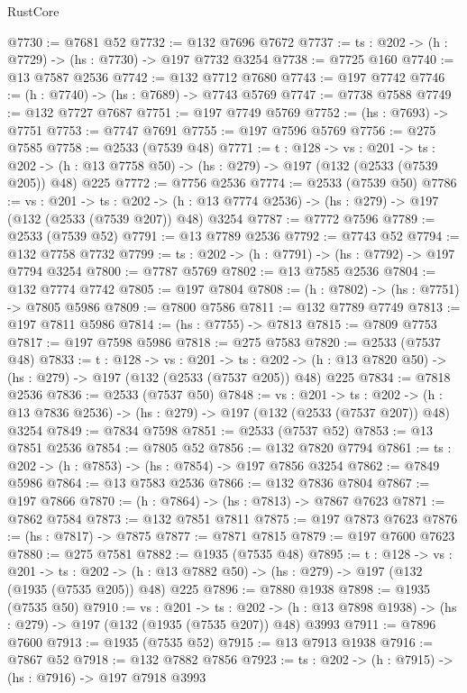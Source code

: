 \begin{lexlean}{RustCore}
\begin{coremodule}
@7730 := @7681 @52
@7732 := @132 @7696 @7672
@7737 := {ts : @202} -> (h : @7729) -> (hs : @7730) -> @197 @7732 @3254
@7738 := @7725 @160
@7740 := @13 @7587 @2536
@7742 := @132 @7712 @7680
@7743 := @197 @7742
@7746 := (h : @7740) -> (hs : @7689) -> @7743 @5769
@7747 := @7738 @7588
@7749 := @132 @7727 @7687
@7751 := @197 @7749 @5769
@7752 := (hs : @7693) -> @7751
@7753 := @7747 @7691
@7755 := @197 @7596 @5769
@7756 := @275 @7585
@7758 := @2533 (@7539 @48)
@7771 := {t : @128} ->
  {vs : @201} ->
  {ts : @202} -> (h : @13 @7758 @50) -> (hs : @279) -> @197 (@132 (@2533 (@7539 @205)) @48) @225
@7772 := @7756 @2536
@7774 := @2533 (@7539 @50)
@7786 := {vs : @201} ->
  {ts : @202} -> (h : @13 @7774 @2536) -> (hs : @279) -> @197 (@132 (@2533 (@7539 @207)) @48) @3254
@7787 := @7772 @7596
@7789 := @2533 (@7539 @52)
@7791 := @13 @7789 @2536
@7792 := @7743 @52
@7794 := @132 @7758 @7732
@7799 := {ts : @202} -> (h : @7791) -> (hs : @7792) -> @197 @7794 @3254
@7800 := @7787 @5769
@7802 := @13 @7585 @2536
@7804 := @132 @7774 @7742
@7805 := @197 @7804
@7808 := (h : @7802) -> (hs : @7751) -> @7805 @5986
@7809 := @7800 @7586
@7811 := @132 @7789 @7749
@7813 := @197 @7811 @5986
@7814 := (hs : @7755) -> @7813
@7815 := @7809 @7753
@7817 := @197 @7598 @5986
@7818 := @275 @7583
@7820 := @2533 (@7537 @48)
@7833 := {t : @128} ->
  {vs : @201} ->
  {ts : @202} -> (h : @13 @7820 @50) -> (hs : @279) -> @197 (@132 (@2533 (@7537 @205)) @48) @225
@7834 := @7818 @2536
@7836 := @2533 (@7537 @50)
@7848 := {vs : @201} ->
  {ts : @202} -> (h : @13 @7836 @2536) -> (hs : @279) -> @197 (@132 (@2533 (@7537 @207)) @48) @3254
@7849 := @7834 @7598
@7851 := @2533 (@7537 @52)
@7853 := @13 @7851 @2536
@7854 := @7805 @52
@7856 := @132 @7820 @7794
@7861 := {ts : @202} -> (h : @7853) -> (hs : @7854) -> @197 @7856 @3254
@7862 := @7849 @5986
@7864 := @13 @7583 @2536
@7866 := @132 @7836 @7804
@7867 := @197 @7866
@7870 := (h : @7864) -> (hs : @7813) -> @7867 @7623
@7871 := @7862 @7584
@7873 := @132 @7851 @7811
@7875 := @197 @7873 @7623
@7876 := (hs : @7817) -> @7875
@7877 := @7871 @7815
@7879 := @197 @7600 @7623
@7880 := @275 @7581
@7882 := @1935 (@7535 @48)
@7895 := {t : @128} ->
  {vs : @201} ->
  {ts : @202} -> (h : @13 @7882 @50) -> (hs : @279) -> @197 (@132 (@1935 (@7535 @205)) @48) @225
@7896 := @7880 @1938
@7898 := @1935 (@7535 @50)
@7910 := {vs : @201} ->
  {ts : @202} -> (h : @13 @7898 @1938) -> (hs : @279) -> @197 (@132 (@1935 (@7535 @207)) @48) @3993
@7911 := @7896 @7600
@7913 := @1935 (@7535 @52)
@7915 := @13 @7913 @1938
@7916 := @7867 @52
@7918 := @132 @7882 @7856
@7923 := {ts : @202} -> (h : @7915) -> (hs : @7916) -> @197 @7918 @3993

\end{coremodule}
\end{lexlean}
